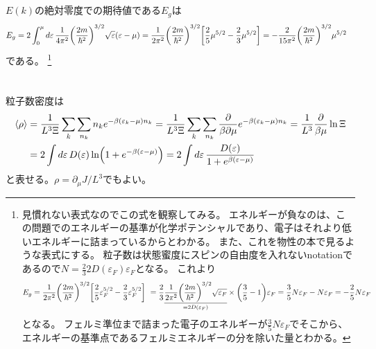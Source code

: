 \documentclass[../ap_2011.tex]{subfiles}
\begin{document}
\section{}
\(E(k)\)の絶対零度での期待値である\(E_g\)は
\begin{equation}\begin{aligned}[b]
    E_g &= 2\int_0^\mu d\varepsilon\,\frac{1}{4\pi^2}\qty(\frac{2m}{\hbar^2})^{3/2}\sqrt{\varepsilon}(\varepsilon-\mu)
    =\frac{1}{2\pi^2}\qty(\frac{2m}{\hbar^2})^{3/2}\qty[\frac{2}{5}\mu^{5/2}-\frac{2}{3}\mu^{5/2}]
    = -\frac{2}{15\pi^2}\qty(\frac{2m}{\hbar^2})^{3/2}\mu^{5/2}
\end{aligned}\end{equation}
である。
\footnote{見慣れない表式なのでこの式を観察してみる。
    エネルギーが負なのは、この問題でのエネルギーの基準が化学ポテンシャルであり、電子はそれより低いエネルギーに詰まっているからとわかる。
    また、これを物性の本で見るような表式にする。
    粒子数は状態蜜度にスピンの自由度を入れないnotationであるので\(N=\frac{2}{3}2D(\varepsilon_F)\varepsilon_F\)となる。
    これより
    \begin{equation*}\begin{aligned}[b]
        E_g =\frac{1}{2\pi^2}\qty(\frac{2m}{\hbar^2})^{3/2}\qty[\frac{2}{5}\varepsilon_F^{5/2}-\frac{2}{3}\varepsilon_F^{5/2}]\
        =\frac{2}{3}\underset{=2D(\varepsilon_F)}{\underline{\frac{1}{2\pi^2}\qty(\frac{2m}{\hbar^2})^{3/2}\sqrt{\varepsilon_F}}}\times\qty(\frac{3}{5}-1)\varepsilon_F
        =\frac{3}{5}N\varepsilon_F-N\varepsilon_F = -\frac{2}{5}N\varepsilon_F
    \end{aligned}\end{equation*}
    となる。
    フェルミ準位まで詰まった電子のエネルギーが\(\frac{3}{5}N\varepsilon_F\)でそこから、
    エネルギーの基準点であるフェルミエネルギーの分を除いた量とわかる。}

\section{}
粒子数密度は
\begin{equation}\begin{aligned}[b]
    \ev{\rho}&=\frac{1}{L^3\Xi}\sum_k\sum_{n_k}n_ke^{-\beta (\varepsilon_k-\mu)n_k}
    =\frac{1}{L^3\Xi}\sum_k\sum_{n_k}\frac{\partial}{\beta\partial\mu}e^{-\beta (\varepsilon_k-\mu)n_k}
    =\frac{1}{L^3}\frac{\partial}{\beta\mu}\ln\Xi\\
    &=2\int d\varepsilon\, D(\varepsilon)\ln(1+e^{-\beta(\varepsilon-\mu)})
    =2\int d\varepsilon\,\frac{D(\varepsilon)}{1+e^{\beta(\varepsilon-\mu)}}
\end{aligned}\end{equation}
と表せる。\(\rho=\partial_\mu J/L^3\)でもよい。
\end{document}
